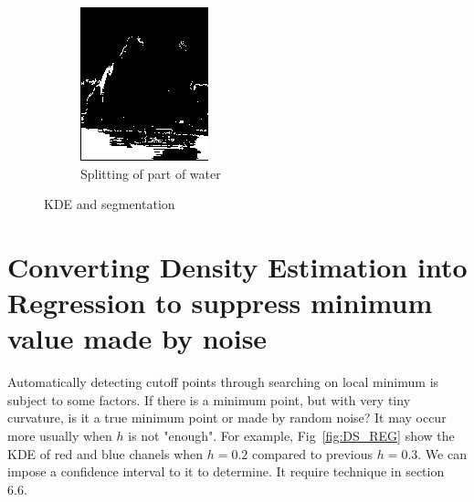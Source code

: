 \documentclass{article}
\begin{document}
\begin{figure}[htb]
\begin{subfigure}[b]{0.24\linewidth}
    \includegraphics[width=\linewidth]{images/toad_split_water.png}
    \caption{Splitting of part of water}
  \end{subfigure}
  \caption{KDE and segmentation}
  \label{fig:splitting}
\end{figure}

\section{Converting Density Estimation into Regression to suppress minimum value made by noise}

Automatically detecting cutoff points through searching on local minimum is subject to some factors. If there is a minimum point, 
but with very tiny curvature, is it a true minimum point or made by random noise? It may occur more usually when $h$ is not "enough".
For example, Fig~\ref{fig:DS_REG} show the KDE of red and blue chanels when $h=0.2$ compared to previous $h=0.3$.
We can impose a confidence interval to it to determine. It require technique in \cite{wasserman2006all} section 6.6.
\end{document}
